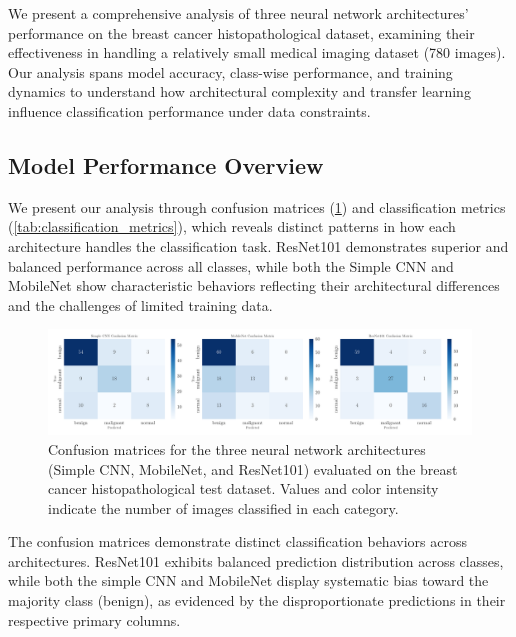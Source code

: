 
We present a comprehensive analysis of three neural network architectures' performance on the breast cancer histopathological dataset, examining their effectiveness in handling a relatively small medical imaging dataset (780 images). Our analysis spans model accuracy, class-wise performance, and training dynamics to understand how architectural complexity and transfer learning influence classification performance under data constraints.

\subsection{Model Performance Overview}

We present our analysis through confusion matrices (\cref{fig:confusion_matrix}) and classification metrics (\cref{tab:classification_metrics}), which reveals distinct patterns in how each architecture handles the classification task. ResNet101 demonstrates superior and balanced performance across all classes, while both the Simple CNN and MobileNet show characteristic behaviors reflecting their architectural differences and the challenges of limited training data.

\begin{figure}[h!]
    \begin{minipage}{.95\textwidth}
        \centering
        \includegraphics[width = .9\textwidth]{../figs/confusion_matrices.pdf}
        \caption{Confusion matrices for the three neural network architectures (Simple CNN, MobileNet, and ResNet101) evaluated on the breast cancer histopathological test dataset. Values and color intensity indicate the number of images classified in each category.}
        \label{fig:confusion_matrix}
    \end{minipage}
\end{figure}
\twocolumngrid

The confusion matrices demonstrate distinct classification behaviors across architectures. ResNet101 exhibits balanced prediction distribution across classes, while both the simple CNN and MobileNet display systematic bias toward the majority class (benign), as evidenced by the disproportionate predictions in their respective primary columns.


